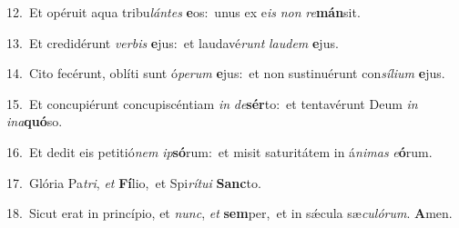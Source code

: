 {\numbfont\textcolor{\numbcolor}{12.}}~Et opéruit aqua tribu\-\textit{lán}\-\textit{tes} \textbf{e}\-os:~\star unus ex e\textit{is} \textit{non} \textit{re}\-\textbf{mán}sit.\par
{\numbfont\textcolor{\numbcolor}{13.}}~Et credidérunt \textit{ver}\-\textit{bis} \textbf{e}\-jus:~\star et laudavé\textit{runt} \textit{lau}\-\textit{dem} \textbf{e}\-jus.\par
{\numbfont\textcolor{\numbcolor}{14.}}~Cito fecérunt, oblíti sunt ó\-\textit{pe}\-\textit{rum} \textbf{e}\-jus:~\star et non sustinuérunt con\-\textit{sí}\-\textit{li}\textit{um} \textbf{e}\-jus.\par
{\numbfont\textcolor{\numbcolor}{15.}}~Et concupiérunt concupiscéntiam \textit{in} \textit{de}\-\textbf{sér}to:~\star et tentavérunt Deum \textit{in} \textit{in}\-\textit{a}\textbf{quó}so.\par
{\numbfont\textcolor{\numbcolor}{16.}}~Et dedit eis petitió\textit{nem} \textit{ip}\-\textbf{só}rum:~\star et misit saturitátem in á\-\textit{ni}\-\textit{mas} \textit{e}\-\textbf{ó}rum.\par
{\numbfont\textcolor{\numbcolor}{17.}}~Glória Pa\-\textit{tri}\-, \textit{et} \textbf{Fí}\-lio,~\star et Spi\-\textit{rí}\-\textit{tu}\textit{i} \textbf{Sanc}\-to.\par
{\numbfont\textcolor{\numbcolor}{18.}}~Sicut erat in princípio, et \textit{nunc}\-, \textit{et} \textbf{sem}\-per,~\star et in sǽcula sæ\-\textit{cu}\-\textit{ló}\textit{rum}. \textbf{A}\-men.\par
